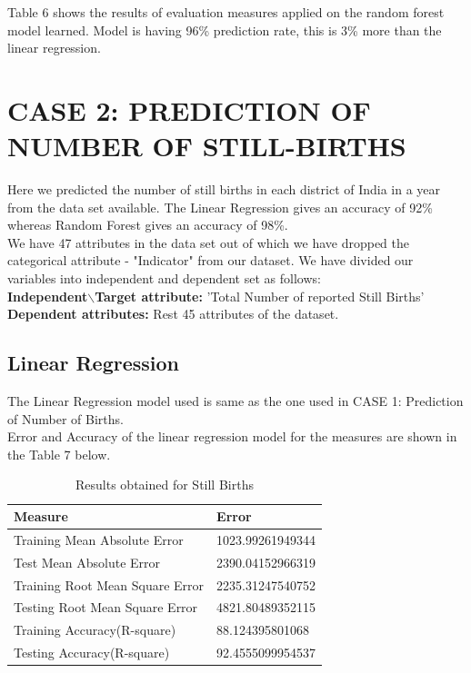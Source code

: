 \documentclass[12pt]{article}
\begin{document}
Table 6 shows the results of evaluation measures applied on the random forest model learned. Model is having 96\% prediction rate, this is 3\% more than the linear regression.\\

\pagebreak
\section{CASE 2: PREDICTION OF NUMBER OF STILL-BIRTHS}

Here we predicted the number of still births in each district of India in a year from the data set available. The Linear Regression gives an accuracy of 92\% whereas Random Forest gives an accuracy of 98\%.\\ 


We have 47 attributes in the data set out of which we have dropped the categorical attribute - "Indicator" from our dataset. We have divided our variables into independent and dependent set as follows:\\

\textbf{Independent$\backslash$Target attribute:} 'Total Number of reported Still Births'\\
\textbf{Dependent attributes:} Rest 45 attributes of the dataset.\\
\subsection{Linear Regression}

The Linear Regression model used is same as the one used in CASE 1: Prediction of Number of Births.\\

Error and Accuracy of the linear regression model for the measures are shown in the Table 7 below.\\

\begin{table}[!h]
\centering
\caption{Results obtained for Still Births}
\vspace{5pt}
\begin{tabular}{|l|l|}
\hline
\textbf{Measure}                & \textbf{Error}   \\ \hline
Training Mean Absolute Error    & 1023.99261949344 \\
Test Mean Absolute Error        & 2390.04152966319 \\
Training Root Mean Square Error & 2235.31247540752 \\
Testing Root Mean Square Error  & 4821.80489352115 \\
Training Accuracy(R-square)     & 88.124395801068  \\
Testing Accuracy(R-square)      & 92.4555099954537	\\ \hline
\end{tabular}
\end{table}
\end{document}
